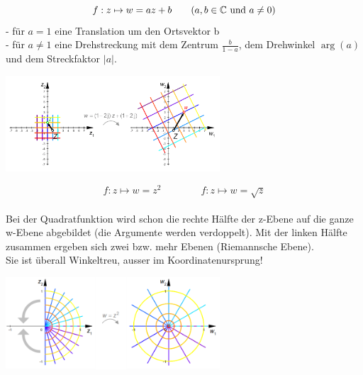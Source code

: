  	\begin{minipage}{9cm}
       $$ f : z \mapsto w = az + b \qquad (a, b \in \mathbb{C} \text{ und } a \neq0)\\$$
		- für $a = 1$ eine Translation um den Ortsvektor b \\
		- für $a \neq 1$ eine Drehstreckung mit dem Zentrum $\frac{b}{1-a}$, dem 
		Drehwinkel $\arg(a)$ und dem Streckfaktor $|a|$.  
    \end{minipage}
	\hspace{2cm}
	\begin{minipage}{8cm}
    	\includegraphics[width=8cm]{./bilder/LineareFunktion.png}
    \end{minipage}

	\begin{minipage}{9cm}
    	$$ f : z \mapsto w = z^2 \qquad \qquad f : z \mapsto w = \sqrt{z} $$\\
		Bei der Quadratfunktion wird schon die rechte Hälfte der z-Ebene auf die ganze
		w-Ebene abgebildet (die Argumente werden verdoppelt). Mit der linken Hälfte zusammen ergeben sich
		zwei bzw. mehr Ebenen (Riemannsche Ebene).\\
		Sie ist überall Winkeltreu, ausser im Koordinatenursprung!
    \end{minipage}
	\hspace{2cm}
	\begin{minipage}{8cm}
    	\includegraphics[width=8cm]{./bilder/quadrat.png} 
    \end{minipage}
    
